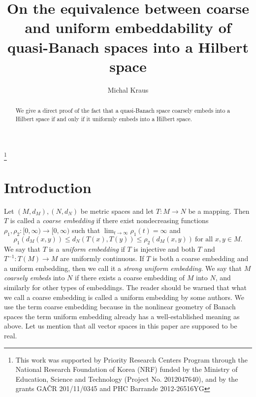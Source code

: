 \documentclass[a4paper,oneside]{amsart}
\theoremstyle{definition}
\begin{document}
\title[Coarse and uniform embeddability]{On the equivalence between coarse and uniform embeddability of quasi-Banach spaces into a Hilbert space}

\author{Michal Kraus}

\address{Pohang Mathematics Institute, Pohang University of Science and Technology, San 31 Hyoja Dong, Nam-Gu, Pohang 790-784, Republic of Korea}




\begin{abstract}
We give a direct proof of the fact that a quasi-Banach space coarsely embeds into a Hilbert space if and only if it uniformly embeds into a Hilbert space.
\end{abstract}

\thanks{This work was supported by Priority Research Centers Program through the National Research Foundation of Korea (NRF) funded by the Ministry of Education, Science and Technology (Project No. 2012047640), and by the grants GA\v{C}R 201/11/0345 and PHC Barrande 2012-26516YG}

\maketitle

\section{Introduction}

Let $(M,d_M),(N,d_N)$ be metric spaces and let $T:M\to N$ be a mapping. Then $T$ is called a \emph{coarse embedding} if there exist nondecreasing functions $\rho_1,\rho_2:[0,\infty)\to[0,\infty)$ such that $\lim_{t\to\infty}\rho_1(t)=\infty$ and
$$\rho_1(d_M(x,y))\leq d_N(T(x),T(y))\leq\rho_2(d_M(x,y))\ \text{for all }x,y\in M.$$
We say that $T$ is a \emph{uniform embedding} if $T$ is injective and both $T$ and $T^{-1}:T(M)\to M$ are uniformly continuous. If $T$ is both a coarse embedding and a uniform embedding, then we call it a \emph{strong uniform embedding}. We say that $M$ \emph{coarsely embeds} into $N$ if there exists a coarse embedding of $M$ into $N$, and similarly for other types of embeddings. The reader should be warned that what we call a coarse embedding is called a uniform embedding by some authors. We use the term coarse embedding because in the nonlinear geometry of Banach spaces the term uniform embedding already has a well-established meaning as above. Let us mention that all vector spaces in this paper are supposed to be real.
\end{document}
